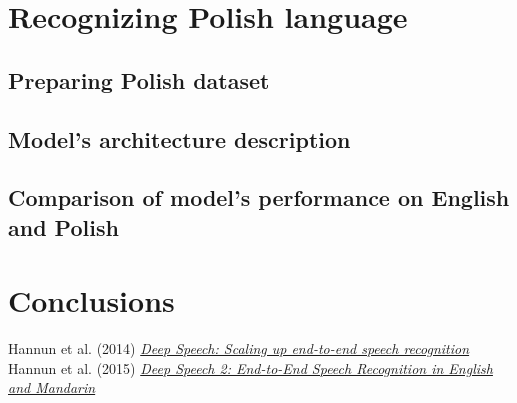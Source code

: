 ﻿\documentclass[11pt,a4paper]{article}
\begin{document}
\newpage
\section{Recognizing Polish language}
\subsection{Preparing Polish dataset}
\subsection{Model’s architecture description}
\subsection{Comparison of model's performance on English and Polish}

\newpage
\section{Conclusions}

\begin{thebibliography}{1}
   Hannun et al. (2014) \href{https://arxiv.org/pdf/1412.5567.pdf}{\em Deep Speech: Scaling up end-to-end speech recognition} 
   Hannun et al. (2015) \href{https://arxiv.org/abs/1512.02595}{\em Deep Speech 2: End-to-End Speech Recognition in English and Mandarin} 
\end{thebibliography}
  
\end{document}
